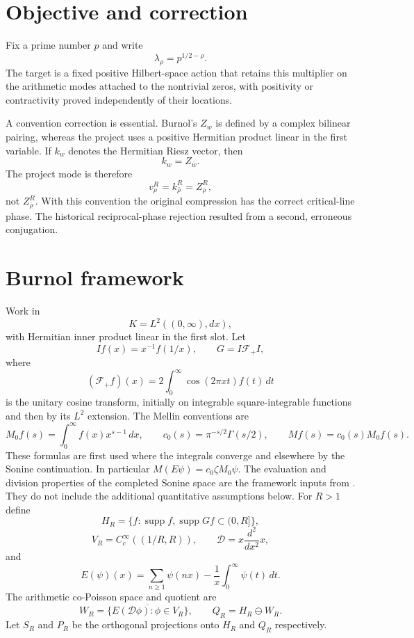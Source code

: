 \documentclass[11pt]{article}
\theoremstyle{remark}
\begin{document}
\clearpage
\tableofcontents
\clearpage
\section{Objective and correction}
Fix a prime number $p$ and write
\[
  \lambda_\rho=p^{1/2-\rho}.
\]
The target is a fixed positive Hilbert-space action that retains this multiplier on the arithmetic modes attached to the nontrivial zeros, with positivity or contractivity proved independently of their locations.

A convention correction is essential. Burnol's $Z_w$ is defined by a complex bilinear pairing, whereas the project uses a positive Hermitian product linear in the first variable. If $k_w$ denotes the Hermitian Riesz vector, then
\[
  k_w=Z_{\bar w}.
\]
The project mode is therefore
\[
  v_\rho^R=k_{\bar\rho}^R=Z_\rho^R,
\]
not $Z_{\bar\rho}^R$. With this convention the original compression has the correct critical-line phase. The historical reciprocal-phase rejection resulted from a second, erroneous conjugation.

\section{Burnol framework}
Work in
\[
 K=L^2((0,\infty),dx),
\]
with Hermitian inner product linear in the first slot. Let
\[
 If(x)=x^{-1}f(1/x),\qquad G=I\mathcal F_+I,
\]
where
\[
 (\mathcal F_+f)(x)=2\int_0^\infty \cos(2\pi xt)f(t)\,dt
\]
is the unitary cosine transform, initially on integrable square-integrable
functions and then by its $L^2$ extension. The Mellin conventions are
\[
 M_0f(s)=\int_0^\infty f(x)x^{s-1}\,dx,\qquad
 c_0(s)=\pi^{-s/2}\Gamma(s/2),\qquad M f(s)=c_0(s)M_0f(s).
\]
These formulas are first used where the integrals converge and elsewhere
by the Sonine continuation. In particular $M(E\psi)=c_0\zeta M_0\psi$.
The evaluation and division properties of the completed Sonine space are
the framework inputs from \cite{Burnol2001,Burnol2002Sonine,BurnolCoPoisson2004}.
They do not include the additional quantitative assumptions below. For $R>1$ define
\[
 H_R=\{f:\operatorname{supp}f,\operatorname{supp}Gf\subset(0,R]\},
\]
\[
 V_R=C_c^\infty((1/R,R)),\qquad
 \mathcal D=x\frac{d^2}{dx^2}x,
\]
and
\[
 E(\psi)(x)=\sum_{n\ge1}\psi(nx)-\frac{1}{x}\int_0^\infty\psi(t)\,dt.
\]
The arithmetic co-Poisson space and quotient are
\[
 W_R=\overline{\{E(\mathcal D\phi):\phi\in V_R\}},\qquad
 Q_R=H_R\ominus W_R.
\]
Let $S_R$ and $P_R$ be the orthogonal projections onto $H_R$ and $Q_R$ respectively.
\end{document}
